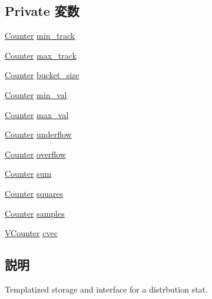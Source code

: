 \subsection*{Private 変数}
\begin{DoxyCompactItemize}
\item 
\hyperlink{namespaceStats_ac35128c026c72bb36af9cea00774e8a6}{Counter} \hyperlink{classStats_1_1DistStor_aa555699f5f2296783768934f45a2aa2f}{min\_\-track}
\item 
\hyperlink{namespaceStats_ac35128c026c72bb36af9cea00774e8a6}{Counter} \hyperlink{classStats_1_1DistStor_accafe9095e4349276ea4de5ce8376dfc}{max\_\-track}
\item 
\hyperlink{namespaceStats_ac35128c026c72bb36af9cea00774e8a6}{Counter} \hyperlink{classStats_1_1DistStor_acf3483d9fb89e37ad01724a4428b3dd2}{bucket\_\-size}
\item 
\hyperlink{namespaceStats_ac35128c026c72bb36af9cea00774e8a6}{Counter} \hyperlink{classStats_1_1DistStor_a99ee5c8f5894036e88e7d30de9fa4211}{min\_\-val}
\item 
\hyperlink{namespaceStats_ac35128c026c72bb36af9cea00774e8a6}{Counter} \hyperlink{classStats_1_1DistStor_a9791349c8134f44e46aa7688b0a9e92b}{max\_\-val}
\item 
\hyperlink{namespaceStats_ac35128c026c72bb36af9cea00774e8a6}{Counter} \hyperlink{classStats_1_1DistStor_af9e29e4a48415bdab1a3273284c1f7d2}{underflow}
\item 
\hyperlink{namespaceStats_ac35128c026c72bb36af9cea00774e8a6}{Counter} \hyperlink{classStats_1_1DistStor_a25f45345808703e64848f43dd7aa9ee7}{overflow}
\item 
\hyperlink{namespaceStats_ac35128c026c72bb36af9cea00774e8a6}{Counter} \hyperlink{classStats_1_1DistStor_ab5b201cce7e10c48f62b71605e75707e}{sum}
\item 
\hyperlink{namespaceStats_ac35128c026c72bb36af9cea00774e8a6}{Counter} \hyperlink{classStats_1_1DistStor_a0c02ec1e072d692448ce4429a78e3675}{squares}
\item 
\hyperlink{namespaceStats_ac35128c026c72bb36af9cea00774e8a6}{Counter} \hyperlink{classStats_1_1DistStor_ab4db99aba3dd28686061dd3d5475b3bd}{samples}
\item 
\hyperlink{classstd_1_1vector}{VCounter} \hyperlink{classStats_1_1DistStor_a8cc2f3a565a2e54ab797f717802bc894}{cvec}
\end{DoxyCompactItemize}


\subsection{説明}
Templatized storage and interface for a distrbution stat. 


